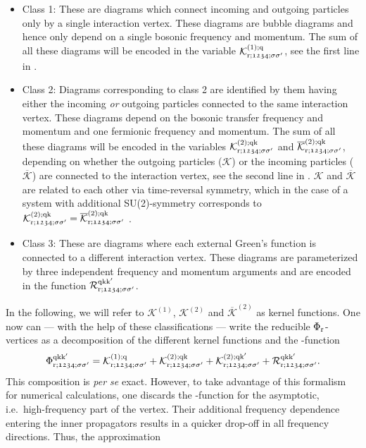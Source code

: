 \documentclass[../../main.tex]{subfiles}
\begin{document}
\begin{itemize}
	\item Class 1: These are diagrams which connect incoming and outgoing particles only by a single interaction vertex. These diagrams are bubble diagrams and hence only depend on a single bosonic frequency and momentum. The sum of all these diagrams will be encoded in the variable $\mathcal{K}^{(1);\text{q}}_{\text{r};\mathfrak{1234};\sigma\sigma'}$, see the first line in .
	\item Class 2: Diagrams corresponding to class 2 are identified by them having either the incoming \textit{or} outgoing particles connected to the same interaction vertex. These diagrams depend on the bosonic transfer frequency and momentum and one fermionic frequency and momentum. The sum of all these diagrams will be encoded in the variables $\mathcal{K}^{(2);\text{q}\text{k}}_{\text{r};\mathfrak{1234};\sigma\sigma'}$ and $\overline{\mathcal{K}}^{(2);\text{q}\text{k}}_{\text{r};\mathfrak{1234};\sigma\sigma'}$, depending on whether the outgoing particles ($\mathcal{K}$) or the incoming particles ($\overline{\mathcal{K}}$) are connected to the interaction vertex, see the second line in . $\mathcal{K}$ and $\overline{\mathcal{K}}$ are related to each other via time-reversal symmetry, which in the case of a system with additional SU(2)-symmetry corresponds to $\mathcal{K}^{(2);\text{q}\text{k}}_{\text{r};\mathfrak{1234};\sigma\sigma'}=\overline{\mathcal{K}}^{(2);\text{q}\text{k}}_{\text{r};\mathfrak{1234};\sigma\sigma'}$ \cite{Rohringer2013}.
	\item Class 3: These are diagrams where each external Green's function is connected to a different interaction vertex. These diagrams are parameterized by three independent frequency and momentum arguments and are encoded in the  function $\mathcal{R}^{\text{q}\text{k}\text{k}'}_{\text{r};\mathfrak{1234};\sigma\sigma'}$.
\end{itemize}
In the following, we will refer to $\mathcal{K}^{(1)}$, $\mathcal{K}^{(2)}$ and $\overline{\mathcal{K}}^{(2)}$ as kernel functions. One now can --- with the help of these classifications --- write the reducible $\Phi_{\text{r}}$-vertices as a decomposition of the different kernel functions and the -function
\begin{align}
	\Phi_{\text{r};\mathfrak{1234};\sigma\sigma'}^{\text{q}\text{k}\text{k}'}=\mathcal{K}^{(1);\text{q}}_{\text{r};\mathfrak{1234};\sigma\sigma'}+\mathcal{K}^{(2);\text{q}\text{k}}_{\text{r};\mathfrak{1234};\sigma\sigma'}+\mathcal{K}^{(2);\text{q}\text{k}'}_{\text{r};\mathfrak{1234};\sigma\sigma'}+\mathcal{R}^{\text{q}\text{k}\text{k}'}_{\text{r};\mathfrak{1234};\sigma\sigma'}.
\end{align}
This composition is \textit{per se} exact. However, to take advantage of this formalism for numerical calculations, one discards the -function for the asymptotic, i.e.\ high-frequency part of the vertex. Their additional frequency dependence entering the inner propagators results in a quicker drop-off in all frequency directions. Thus, the approximation
\end{document}

